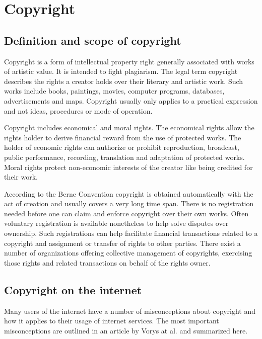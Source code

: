 \documentclass[a4paper]{report}
\begin{document}
\section{Copyright}
\label{sec:Copyright}

\subsection{Definition and scope of copyright}
\label{sec:CopyDef}
Copyright is a form of intellectual property right generally associated with works of artistic value. It is intended to fight plagiarism. The legal term copyright describes the rights a creator holds over their literary and artistic work. Such works include books, paintings, movies, computer programs, databases, advertisements and maps. Copyright usually only applies to a practical expression and not ideas, procedures or mode of operation. \parencite{CopyGov}

Copyright includes economical and moral rights. The economical rights allow the rights holder to derive financial reward from the use of protected works. The holder of economic rights can authorize or prohibit reproduction, broadcast, public performance, recording, translation and adaptation of protected works. Moral rights protect non-economic interests of the creator like being credited for their work. \parencite{WikiCopy}

According to the Berne Convention copyright is obtained automatically with the act of creation and usually covers a very long time span. \parencite{WikiBerne} There is no registration needed before one can claim and enforce copyright over their own works. Often voluntary registration is available nonetheless to help solve disputes over ownership. Such registrations can help facilitate financial transactions related to a copyright and assignment or transfer of rights to other parties. There exist a number of organizations offering collective management of copyrights, exercising those rights and related transactions on behalf of the rights owner.

\subsection{Copyright on the internet}
Many users of the internet have a number of misconceptions about copyright and how it applies to their usage of internet services. The most important misconceptions are outlined in an article by Vorys at al. \parencite{Vorys2013} and summarized here.
\end{document}
